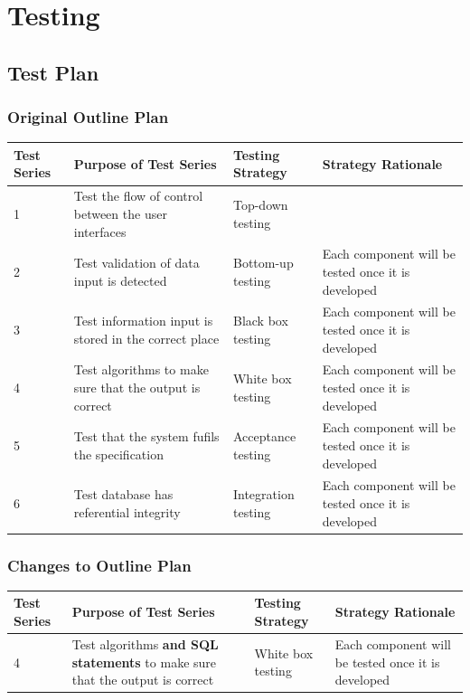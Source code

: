 \chapter{Testing}

\section{Test Plan}

\begin{landscape}
\subsection{Original Outline Plan}

\begin{center}
    \begin{tabular}{|p{2cm}|p{5cm}|p{5cm}|p{4cm}|}
        \hline
        \textbf{Test Series} & \textbf{Purpose of Test Series} & \textbf{Testing Strategy} & \textbf{Strategy Rationale}\\ \hline
         1 & Test the flow of control between the user interfaces & Top-down testing &  \\ \hline
	2 & Test validation of data input is detected & Bottom-up testing & Each component will be tested once it is developed \\ \hline
	3 & Test information input is stored in the correct place & Black box testing & Each component will be tested once it is developed \\ \hline
	4 & Test algorithms to make sure that the output is correct & White box testing & Each component will be tested once it is developed \\ \hline
	5 & Test that the system fufils the specification & Acceptance testing & Each component will be tested once it is developed \\ \hline
	6 & Test database has referential integrity & Integration testing & Each component will be tested once it is developed \\ \hline
    \end{tabular}
\end{center}

\subsection{Changes to Outline Plan}

\begin{center}
    \begin{tabular}{|p{2cm}|p{5cm}|p{5cm}|p{4cm}|}
        \hline
        \textbf{Test Series} & \textbf{Purpose of Test Series} & \textbf{Testing Strategy} & \textbf{Strategy Rationale}\\ \hline
	4 & Test algorithms \textbf{and SQL statements} to make sure that the output is correct & White box testing & Each component will be tested once it is developed \\ \hline
    \end{tabular}
\end{center}


\end{landscape}
